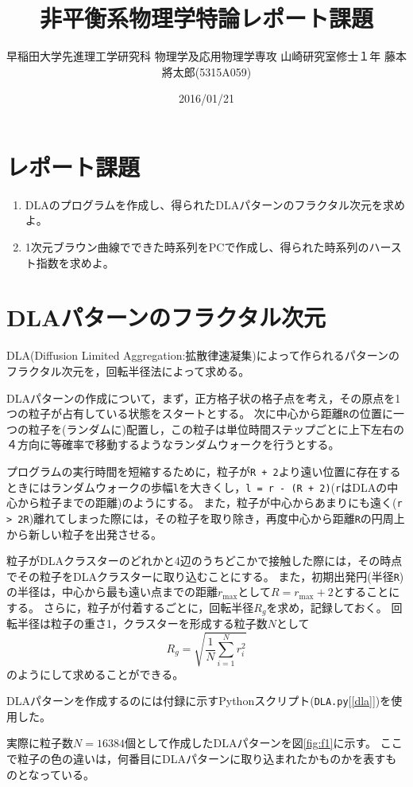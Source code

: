 \documentclass{jsarticle}
\title{非平衡系物理学特論レポート課題}
\author{早稲田大学先進理工学研究科 物理学及応用物理学専攻 山崎研究室修士１年
藤本將太郎(5315A059)}
\date{2016/01/21}
\theoremstyle{definition}
\begin{document}
\setcounter{section}{-1}
\section{レポート課題}

\begin{enumerate}
\def\labelenumi{\arabic{enumi}.}
\itemsep1pt\parskip0pt
\item
  DLAのプログラムを作成し、得られたDLAパターンのフラクタル次元を求めよ。
\item
  1次元ブラウン曲線でできた時系列をPCで作成し、得られた時系列のハースト指数を求めよ。
\end{enumerate}

\section{DLAパターンのフラクタル次元}

DLA(Diffusion Limited
Aggregation:拡散律速凝集)によって作られるパターンのフラクタル次元を，回転半径法によって求める。

DLAパターンの作成について，まず，正方格子状の格子点を考え，その原点を1つの粒子が占有している状態をスタートとする。
次に中心から距離\texttt{R}の位置に一つの粒子を(ランダムに)配置し，この粒子は単位時間ステップごとに上下左右の４方向に等確率で移動するようなランダムウォークを行うとする。

プログラムの実行時間を短縮するために，粒子が\texttt{R + 2}より遠い位置に存在するときにはランダムウォークの歩幅\texttt{l}を大きくし，\texttt{l = r - (R + 2)}(\texttt{r}はDLAの中心から粒子までの距離)のようにする。
また，粒子が中心からあまりにも遠く(\texttt{r \textgreater{} 2R})離れてしまった際には，その粒子を取り除き，再度中心から距離\texttt{R}の円周上から新しい粒子を出発させる。

粒子がDLAクラスターのどれかと4辺のうちどこかで接触した際には，その時点でその粒子をDLAクラスターに取り込むことにする。
また，初期出発円(半径\texttt{R})の半径は，中心から最も遠い点までの距離$r_{\text{max}}$として$R = r_{\text{max}} + 2$とすることにする。
さらに，粒子が付着するごとに，回転半径$R_{g}$を求め，記録しておく。
回転半径は粒子の重さ1，クラスターを形成する粒子数$N$として
\[R_{g} = \sqrt{\frac{1}{N} \sum_{i=1}^{N} r_{i}^{2}}\]
のようにして求めることができる。

DLAパターンを作成するのには付録に示すPythonスクリプト(\texttt{DLA.py}[\ref{dla}])を使用した。

実際に粒子数$N=16384$個として作成したDLAパターンを図\ref{fig:f1}に示す。
ここで粒子の色の違いは，何番目にDLAパターンに取り込まれたかものかを表すものとなっている。
\end{document}
